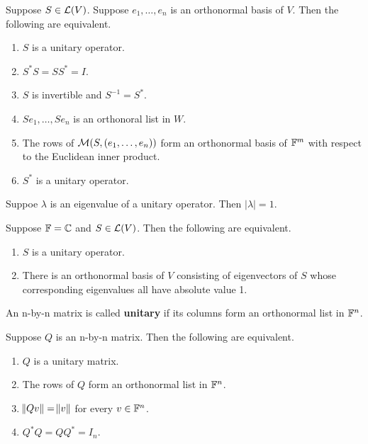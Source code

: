 \documentclass{extarticle}
\begin{document}
\begin{thm}
    Suppose \(S \in \mathcal{L}(V)\). Suppose \(e_1, \ldots, e_n\) is an orthonormal basis of \(V\). 
    Then the following are equivalent. 
    \begin{enumerate}[label=(\alph*)]
        \item \(S\) is a unitary operator.  
        \item \(S^* S = SS^* =  I\). 
        \item \(S\) is invertible and \(S^{-1} =S^*\).  
        \item \(Se_1, \ldots, Se_n\) is an orthonoral list in \(W\). 
        \item The rows of \(\mathcal{M}(S, (e_1, \ldots, e_n))\) form an orthonormal 
        basis of \(\mathbb{F}^m\) with respect to the Euclidean inner product. 
        \item \(S^*\) is a unitary operator. 
    \end{enumerate}
\end{thm}


\begin{corollary}
    Suppoe \(\lambda\) is an eigenvalue of a unitary operator. Then 
    \(|\lambda| = 1\).
\end{corollary}

\begin{corollary}
    Suppose \(\mathbb{F} = \mathbb{C}\) and \(S \in \mathcal{L}(V)\). Then the following are equivalent. 
    \begin{enumerate}[label=(\alph*)]
        \item \(S\) is a unitary operator. 
        \item There is an orthonormal basis of \(V\) consisting of eigenvectors of \(S\) whose 
        corresponding eigenvalues all have absolute value 1. 
    \end{enumerate}
\end{corollary}



\begin{definition}
    An n-by-n matrix is called \textbf{unitary} if its columns form an orthonormal list in \(\mathbb{F}^n\).
\end{definition}


\begin{thm}
    Suppose \(Q\) is an n-by-n matrix. Then the following are equivalent. 
    \begin{enumerate}[label=(\alph*)]
        \item \(Q\) is a unitary matrix. 
        \item The rows of \(Q\) form an orthonormal list in \(\mathbb{F}^n\). 
        \item \(\norm{Qv} = \norm{v}\) for every \(v \in \mathbb{F}^n\). 
        \item \(Q^* Q = Q Q^* = I_n\).
    \end{enumerate}
\end{thm}
\end{document}

